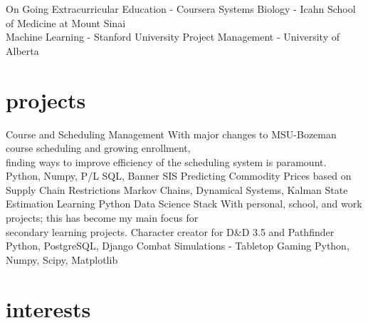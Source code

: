 \documentclass[]{two-column-stats} %
\begin{document}
\begin{entrylist}
\thinentry
{On Going}
{Extracurricular Education - Coursera}
{Systems Biology - Icahn School of Medicine at Mount Sinai \\
 Machine Learning - Stanford University
 Project Management - University of Alberta}
\end{entrylist}

\pagebreak
\section{projects}

\begin{entrylist}
\wideentry
{Course and Scheduling Management}
{With major changes to MSU-Bozeman course scheduling and growing enrollment, \\
finding ways to improve efficiency of the scheduling system is paramount. \\
Python, Numpy, P/L SQL, Banner SIS}
\wideentry
{Predicting Commodity Prices based on Supply Chain Restrictions}
{Markov Chains, Dynamical Systems, Kalman State Estimation}
\wideentry
{Learning Python Data Science Stack}
{With personal, school, and work projects; this has become my main focus for \\
secondary learning projects.}
\wideentry
{Character creator for D\&D 3.5 and Pathfinder}
{Python, PostgreSQL, Django}
\wideentry
{Combat Simulations - Tabletop Gaming}
{Python, Numpy, Scipy, Matplotlib}
\end{entrylist}


\section{interests}
\end{document}
